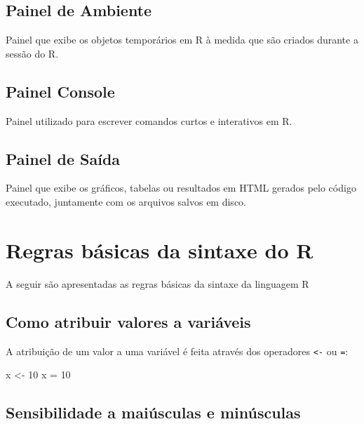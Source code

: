 \documentclass[
  letterpaper,
  DIV=11,
  numbers=noendperiod]{scrreprt}
\newenvironment{Shaded}{\begin{snugshade}}{\end{snugshade}}
\newcommand{\DecValTok}[1]{\textcolor[rgb]{0.68,0.00,0.00}{#1}}
\newcommand{\NormalTok}[1]{\textcolor[rgb]{0.00,0.23,0.31}{#1}}
\newcommand{\OtherTok}[1]{\textcolor[rgb]{0.00,0.23,0.31}{#1}}
\begin{document}
\subsection{Painel de Ambiente}\label{painel-de-ambiente}

Painel que exibe os objetos temporários em R à medida que são criados
durante a sessão do R.

\subsection{Painel Console}\label{painel-console}

Painel utilizado para escrever comandos curtos e interativos em R.

\subsection{Painel de Saída}\label{painel-de-sauxedda}

Painel que exibe os gráficos, tabelas ou resultados em HTML gerados pelo
código executado, juntamente com os arquivos salvos em disco.

\section{Regras básicas da sintaxe do
R}\label{regras-buxe1sicas-da-sintaxe-do-r}

A seguir são apresentadas as regras básicas da sintaxe da linguagem R

\subsection{Como atribuir valores a
variáveis}\label{como-atribuir-valores-a-variuxe1veis}

A atribuição de um valor a uma variável é feita através dos operadores
\texttt{\textless{}-} ou \texttt{=}:

\begin{Shaded}
\begin{Highlighting}[]
\NormalTok{x }\OtherTok{\textless{}{-}} \DecValTok{10}
\NormalTok{x }\OtherTok{=} \DecValTok{10}
\end{Highlighting}
\end{Shaded}

\subsection{Sensibilidade a maiúsculas e
minúsculas}\label{sensibilidade-a-maiuxfasculas-e-minuxfasculas}
\end{document}
